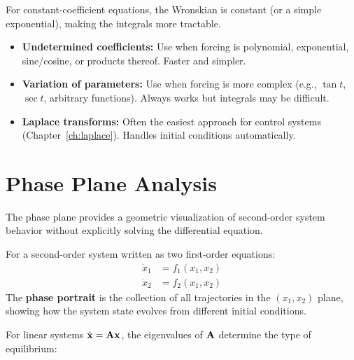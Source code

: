 For constant-coefficient equations, the Wronskian is constant (or a simple exponential), making the integrals more tractable.

\begin{practicalbox}[title=When to Use Each Method]
\begin{itemize}
    \item \textbf{Undetermined coefficients:} Use when forcing is polynomial, exponential, sine/cosine, or products thereof. Faster and simpler.
    \item \textbf{Variation of parameters:} Use when forcing is more complex (e.g., $\tan t$, $\sec t$, arbitrary functions). Always works but integrals may be difficult.
    \item \textbf{Laplace transforms:} Often the easiest approach for control systems (Chapter~\ref{ch:laplace}). Handles initial conditions automatically.
\end{itemize}
\end{practicalbox}

\section{Phase Plane Analysis}
\label{sec:phase_plane}

The phase plane provides a geometric visualization of second-order system behavior without explicitly solving the differential equation.

\begin{definitionbox}[title=Definition: Phase Portrait]
For a second-order system written as two first-order equations:
\begin{align}
\dot{x}_1 &= f_1(x_1, x_2) \\
\dot{x}_2 &= f_2(x_1, x_2)
\end{align}
The \textbf{phase portrait} is the collection of all trajectories in the $(x_1, x_2)$ plane, showing how the system state evolves from different initial conditions.
\end{definitionbox}

For linear systems $\dot{\mathbf{x}} = \mathbf{A}\mathbf{x}$, the eigenvalues of $\mathbf{A}$ determine the type of equilibrium:

